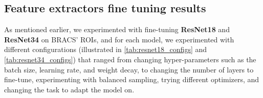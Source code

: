 \documentclass[
11pt, %
english, %
singlespacing, %
headsepline, %
]{project_structure}
\begin{document}
\subsection{Feature extractors fine tuning results}

\noindent As mentioned earlier, we experimented with fine-tuning \textbf{\acrshort{ResNet}18} and \textbf{\acrshort{ResNet}34} on \acrshort{BRACS}' \acrshort{ROI}s, and for each model, we experimented with different configurations (illustrated in \autoref{tab:resnet18_configs} and \autoref{tab:resnet34_configs}) that ranged from changing hyper-parameters such as the batch size, learning rate, and weight decay, to changing the number of layers to fine-tune, experimenting with balanced sampling, trying different optimizers, and changing the task to adapt the model on.



\end{document}
